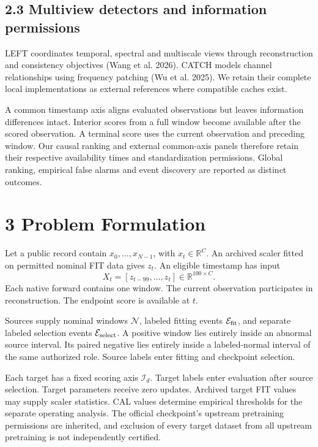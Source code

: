 \documentclass[
  english,
  10pt,
]{article}
\begin{document}
\subsection{2.3 Multiview detectors and information
permissions}\label{multiview-detectors-and-information-permissions}

LEFT coordinates temporal, spectral and multiscale views through
reconstruction and consistency objectives (Wang et al. 2026). CATCH
models channel relationships using frequency patching (Wu et al. 2025).
We retain their complete local implementations as external references
where compatible caches exist.

A common timestamp axis aligns evaluated observations but leaves
information differences intact. Interior scores from a full window
become available after the scored observation. A terminal score uses the
current observation and preceding window. Our causal ranking and
external common-axis panels therefore retain their respective
availability times and standardization permissions. Global ranking,
empirical false alarms and event discovery are reported as distinct
outcomes.

\section{3 Problem Formulation}\label{problem-formulation}

Let a public record contain \(x_0,\ldots,x_{N-1}\), with
\(x_t\in\mathbb R^C\). An archived scaler fitted on permitted nominal
FIT data gives \(z_t\). An eligible timestamp has input \[
X_t=[z_{t-99},\ldots,z_t]\in\mathbb R^{100\times C}.
\] Each native forward contains one window. The current observation
participates in reconstruction. The endpoint score is available at
\(t\).

Sources supply nominal windows \(\mathcal N\), labeled fitting events
\(\mathcal E_{\rm fit}\), and separate labeled selection events
\(\mathcal E_{\rm select}\). A positive window lies entirely inside an
abnormal source interval. Its paired negative lies entirely inside a
labeled-normal interval of the same authorized role. Source labels enter
fitting and checkpoint selection.

Each target has a fixed scoring axis \(\mathcal I_d\). Target labels
enter evaluation after source selection. Target parameters receive zero
updates. Archived target FIT values may supply scaler statistics. CAL
values determine empirical thresholds for the separate operating
analysis. The official checkpoint's upstream pretraining permissions are
inherited, and exclusion of every target dataset from all upstream
pretraining is not independently certified.
\end{document}
